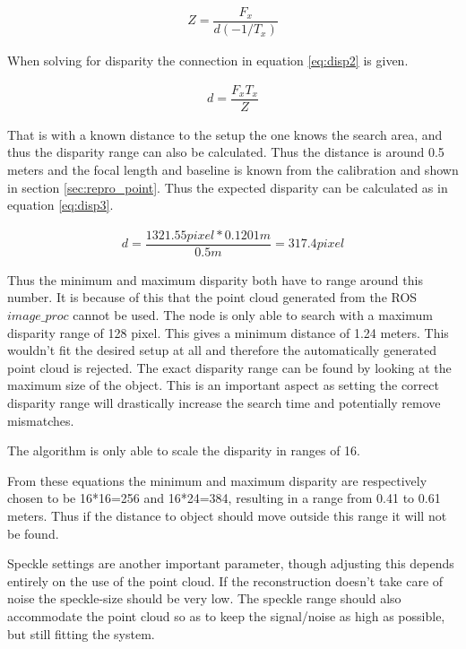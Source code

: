 \begin{equation}\label{eq:disp1}
\begin{split}
Z = \dfrac{F_{x}}{ d(-1/T_{x})}
\end{split}
\end{equation} 

When solving for disparity the connection in equation \ref{eq:disp2} is given.

\begin{equation}\label{eq:disp2}
\begin{split}
 d = \dfrac{F_{x}T_{x}}{ Z}
\end{split}
\end{equation} 

That is with a known distance to the setup the one knows the search area, and thus the disparity range can also be calculated. Thus the distance is around 0.5 meters and the focal length and baseline is known from the calibration and shown in section \ref{sec:repro_point}. Thus the expected disparity can be calculated as in equation \ref{eq:disp3}.

\begin{equation}\label{eq:disp3}
\begin{split}
d = \dfrac{1321.55 pixel*0.1201m}{0.5m} = 317.4 pixel
\end{split}
\end{equation}

Thus the minimum and maximum disparity both have to range around this number. It is because of this that the point cloud generated from the ROS $image\_proc$ cannot be used. The node is only able to search with a maximum disparity range of 128 pixel. This gives a minimum distance of 1.24 meters. This wouldn't fit the desired setup at all and therefore the automatically generated point cloud is rejected. The exact disparity range can be found by looking at the maximum size of the object. This is an important aspect as setting the correct disparity range will drastically increase the search time and potentially remove mismatches.

The algorithm is only able to scale the disparity in ranges of 16.

From these equations the minimum and maximum disparity are respectively chosen to be 16*16=256 and                                   16*24=384, resulting in a range from 0.41 to 0.61 meters. Thus if the distance to object should move outside this range it will not be found.

Speckle settings are another important parameter, though adjusting this depends entirely on the use of the point cloud. If the reconstruction doesn't take care of noise the speckle-size should be very low. The speckle range should also accommodate the point cloud so as to keep the signal/noise as high as possible, but still fitting the system.





